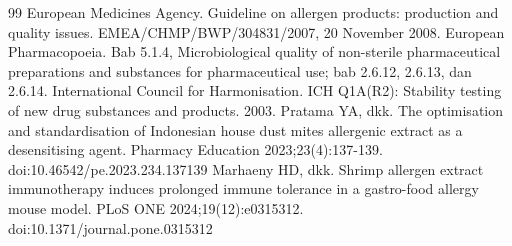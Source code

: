 \documentclass[11pt,a4paper]{article}
\begin{document}
\begin{thebibliography}{99}
\small
\setlength{\itemsep}{2pt}
 European Medicines Agency. Guideline on allergen products: production and quality issues. EMEA/CHMP/BWP/304831/2007, 20 November 2008.
 European Pharmacopoeia. Bab 5.1.4, Microbiological quality of non-sterile pharmaceutical preparations and substances for pharmaceutical use; bab 2.6.12, 2.6.13, dan 2.6.14.
 International Council for Harmonisation. ICH Q1A(R2): Stability testing of new drug substances and products. 2003.
 Pratama YA, dkk. The optimisation and standardisation of Indonesian house dust mites allergenic extract as a desensitising agent. Pharmacy Education 2023;23(4):137-139. doi:10.46542/pe.2023.234.137139
 Marhaeny HD, dkk. Shrimp allergen extract immunotherapy induces prolonged immune tolerance in a gastro-food allergy mouse model. PLoS ONE 2024;19(12):e0315312. doi:10.1371/journal.pone.0315312
\end{thebibliography}
\end{document}
